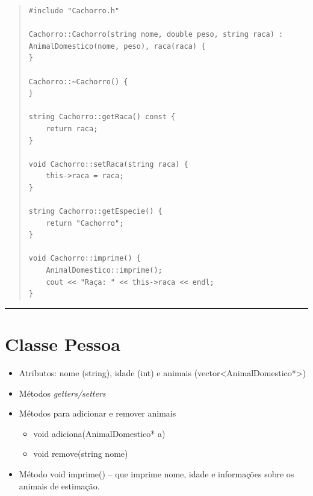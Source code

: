 \documentclass[12pt]{article}
\begin{document}
\begin{quote}
\begin{scriptsize}
\begin{verbatim}
#include "Cachorro.h"

Cachorro::Cachorro(string nome, double peso, string raca) :
AnimalDomestico(nome, peso), raca(raca) {
}

Cachorro::~Cachorro() {
}

string Cachorro::getRaca() const {
    return raca;
}

void Cachorro::setRaca(string raca) {
    this->raca = raca;
}

string Cachorro::getEspecie() {
    return "Cachorro";
}

void Cachorro::imprime() {
    AnimalDomestico::imprime();
    cout << "Raça: " << this->raca << endl;
}
\end{verbatim}
\end{scriptsize}
\end{quote}

\par\noindent\rule{\textwidth}{0.4pt}

\section*{Classe {\sf Pessoa}}

\begin{itemize}

\item Atributos: nome ({\sf string}), idade ({\sf int}) e animais ({\sf vector<AnimalDomestico*>})
       
\item Métodos {\it getters/setters}

\item Métodos para adicionar e remover animais

\begin{itemize}

\item {\sf void adiciona(AnimalDomestico* a)}

\item {\sf void remove(string nome)}

\end{itemize}

\item Método {\sf void imprime()} -- que imprime nome, idade e informações sobre os animais de estimação.

\end{itemize}
\end{document}
